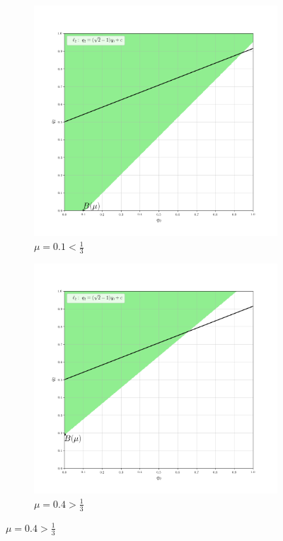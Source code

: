 \begin{flushleft}
	\begin{figure}[h]
    	\centering
     	\begin{subfigure}[b]{0.45 \textwidth}
        	\centering
        	\includegraphics[width=\textwidth]{images/graf_3_3}
        	\caption{$\mu=0.1 < \frac{1}{3}$}
         	\label{fig:y equals x}
     	\end{subfigure}
     	\hspace{10mm}
     	\begin{subfigure}[b]{0.45 \textwidth}
        	\centering
        	\includegraphics[width=\textwidth]{images/graf_3_4}
        	\caption{$\mu=0.4 > \frac{1}{3}$}
        	\label{fig:three sin x}
     	\end{subfigure}
	\end{figure}	


\end{flushleft}
